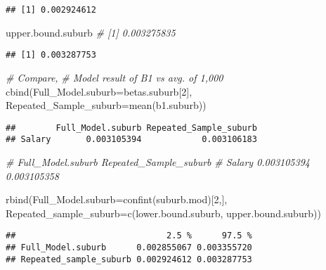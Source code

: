 \documentclass[
]{article}
\newenvironment{Shaded}{\begin{snugshade}}{\end{snugshade}}
\newcommand{\AttributeTok}[1]{\textcolor[rgb]{0.77,0.63,0.00}{#1}}
\newcommand{\CommentTok}[1]{\textcolor[rgb]{0.56,0.35,0.01}{\textit{#1}}}
\newcommand{\DecValTok}[1]{\textcolor[rgb]{0.00,0.00,0.81}{#1}}
\newcommand{\FunctionTok}[1]{\textcolor[rgb]{0.00,0.00,0.00}{#1}}
\newcommand{\NormalTok}[1]{#1}
\begin{document}
\begin{verbatim}
## [1] 0.002924612
\end{verbatim}

\begin{Shaded}
\begin{Highlighting}[]
\NormalTok{upper.bound.suburb     }\CommentTok{\# [1] 0.003275835}
\end{Highlighting}
\end{Shaded}

\begin{verbatim}
## [1] 0.003287753
\end{verbatim}

\begin{Shaded}
\begin{Highlighting}[]
\CommentTok{\# Compare,}
\CommentTok{\# Model result of B1 vs avg. of 1,000 }
\FunctionTok{cbind}\NormalTok{(}\AttributeTok{Full\_Model.suburb=}\NormalTok{betas.suburb[}\DecValTok{2}\NormalTok{], }\AttributeTok{Repeated\_Sample\_suburb=}\FunctionTok{mean}\NormalTok{(b1.suburb))  }
\end{Highlighting}
\end{Shaded}

\begin{verbatim}
##        Full_Model.suburb Repeated_Sample_suburb
## Salary       0.003105394            0.003106183
\end{verbatim}

\begin{Shaded}
\begin{Highlighting}[]
    \CommentTok{\#           Full\_Model.suburb     Repeated\_Sample\_suburb}
    \CommentTok{\# Salary         0.003105394              0.003105358}


\FunctionTok{rbind}\NormalTok{(}\AttributeTok{Full\_Model.suburb=}\FunctionTok{confint}\NormalTok{(suburb.mod)[}\DecValTok{2}\NormalTok{,], }\AttributeTok{Repeated\_sample\_suburb=}\FunctionTok{c}\NormalTok{(lower.bound.suburb, upper.bound.suburb))}
\end{Highlighting}
\end{Shaded}

\begin{verbatim}
##                              2.5 %      97.5 %
## Full_Model.suburb      0.002855067 0.003355720
## Repeated_sample_suburb 0.002924612 0.003287753
\end{verbatim}
\end{document}
